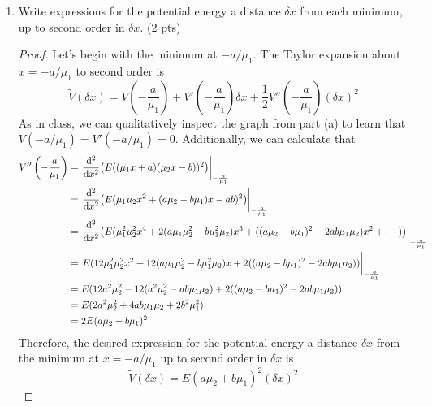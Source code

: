 \documentclass[../psets.tex]{subfiles}
\begin{document}
\begin{enumerate}
\begin{enumerate}
\begin{proof}
\begin{center}
            \end{center}
        \end{proof}
        \item Write expressions for the potential energy a distance $\delta x$ from each minimum, up to second order in $\delta x$. (2 pts)
        \begin{proof}
            Let's begin with the minimum at $-a/\mu_1$. The Taylor expansion about $x=-a/\mu_1$ to second order is
            \begin{equation*}
                \tilde{V}(\delta x) = V\left( -\frac{a}{\mu_1} \right)+V'\left( -\frac{a}{\mu_1} \right)\delta x+\frac{1}{2}V''\left( -\frac{a}{\mu_1} \right)(\delta x)^2
            \end{equation*}
            As in class, we can qualitatively inspect the graph from part (a) to learn that $V(-a/\mu_1)=V'(-a/\mu_1)=0$. Additionally, we can calculate that
            \begin{align*}
                V''\left( -\frac{a}{\mu_1} \right) &= \eval{\dv[2]{x}(E((\mu_1x+a)(\mu_2x-b))^2)}_{-\frac{a}{\mu_1}}\\
                &= \eval{\dv[2]{x}(E(\mu_1\mu_2x^2+(a\mu_2-b\mu_1)x-ab)^2)}_{-\frac{a}{\mu_1}}\\
                &= \eval{\dv[2]{x}(E(\mu_1^2\mu_2^2x^4+2(a\mu_1\mu_2^2-b\mu_1^2\mu_2)x^3+((a\mu_2-b\mu_1)^2-2ab\mu_1\mu_2)x^2+\cdots))}_{-\frac{a}{\mu_1}}\\
                &= \eval{E(12\mu_1^2\mu_2^2x^2+12(a\mu_1\mu_2^2-b\mu_1^2\mu_2)x+2((a\mu_2-b\mu_1)^2-2ab\mu_1\mu_2))}_{-\frac{a}{\mu_1}}\\
                &= E(12a^2\mu_2^2-12(a^2\mu_2^2-ab\mu_1\mu_2)+2((a\mu_2-b\mu_1)^2-2ab\mu_1\mu_2))\\
                &= E(2a^2\mu_2^2+4ab\mu_1\mu_2+2b^2\mu_1^2)\\
                &= 2E(a\mu_2+b\mu_1)^2
            \end{align*}
            Therefore, the desired expression for the potential energy a distance $\delta x$ from the minimum at $x=-a/\mu_1$ up to second order in $\delta x$ is
            \begin{equation*}
                \boxed{\tilde{V}(\delta x) = E(a\mu_2+b\mu_1)^2(\delta x)^2}
            \end{equation*}

\end{proof}
\end{enumerate}
\end{enumerate}
\end{document}
